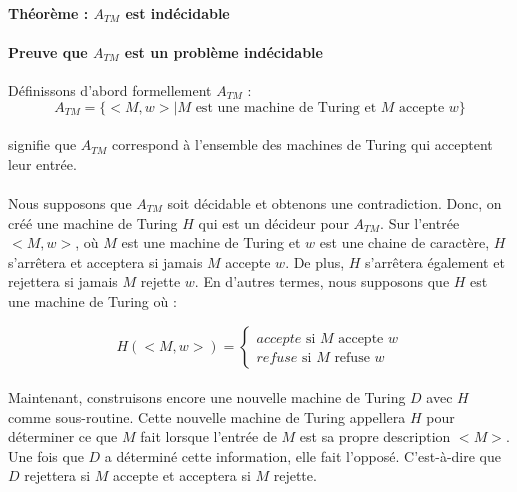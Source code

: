 \paragraph{Théorème : $A_{TM}$ est indécidable}
\paragraph{Preuve que $A_{TM}$ est un problème indécidable} 
Définissons d'abord formellement $A_{TM}$ : 
\begin{equation}
A_{TM} = \{ <M, w> | M \text{ est une machine de Turing et } M \text{ accepte } w \}
\end{equation}
\paragraph{}
signifie que $A_{TM}$ correspond à l'ensemble des machines de Turing qui acceptent leur entrée.
\paragraph{}
Nous supposons que $A_{TM}$ soit décidable et obtenons une contradiction. Donc, on créé une machine de Turing $H$ qui est un décideur pour $A_{TM}$. Sur l'entrée $<M, w>$, où $M$ est une machine de Turing et $w$ est une chaine de caractère, $H$ s'arrêtera et acceptera si jamais $M$ accepte $w$. De plus, $H$ s'arrêtera également et rejettera si jamais $M$ rejette $w$. En d'autres termes, nous supposons que $H$ est une machine de Turing où : 

\begin{equation}
H(<M, w>) = \left\{
              \begin{array}{ll}
                  accepte \text{ si } M \text{ accepte } w \\
                  refuse  \text{ si } M \text{ refuse }  w
              \end{array}
            \right.
\end{equation}

\paragraph{}
Maintenant, construisons encore une nouvelle machine de Turing $D$ avec $H$ comme sous-routine. Cette nouvelle machine de Turing appellera $H$ pour déterminer ce que $M$ fait lorsque l'entrée de $M$ est sa propre description $<M>$. Une fois que $D$ a déterminé cette information, elle fait l'opposé. C'est-à-dire que $D$ rejettera si $M$ accepte et acceptera si $M$ rejette.


